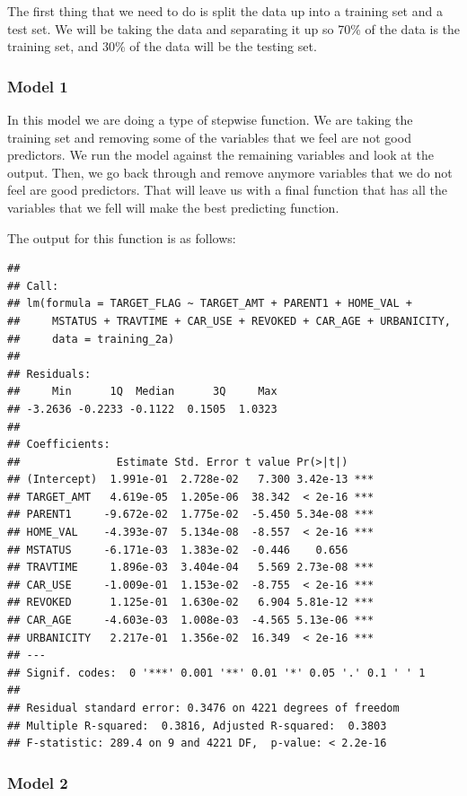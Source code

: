 \documentclass[]{article}
\begin{document}
The first thing that we need to do is split the data up into a training
set and a test set. We will be taking the data and separating it up so
70\% of the data is the training set, and 30\% of the data will be the
testing set.

\subsubsection{Model 1}\label{model-1}

In this model we are doing a type of stepwise function. We are taking
the training set and removing some of the variables that we feel are not
good predictors. We run the model against the remaining variables and
look at the output. Then, we go back through and remove anymore
variables that we do not feel are good predictors. That will leave us
with a final function that has all the variables that we fell will make
the best predicting function.

The output for this function is as follows:

\begin{verbatim}
## 
## Call:
## lm(formula = TARGET_FLAG ~ TARGET_AMT + PARENT1 + HOME_VAL + 
##     MSTATUS + TRAVTIME + CAR_USE + REVOKED + CAR_AGE + URBANICITY, 
##     data = training_2a)
## 
## Residuals:
##     Min      1Q  Median      3Q     Max 
## -3.2636 -0.2233 -0.1122  0.1505  1.0323 
## 
## Coefficients:
##               Estimate Std. Error t value Pr(>|t|)    
## (Intercept)  1.991e-01  2.728e-02   7.300 3.42e-13 ***
## TARGET_AMT   4.619e-05  1.205e-06  38.342  < 2e-16 ***
## PARENT1     -9.672e-02  1.775e-02  -5.450 5.34e-08 ***
## HOME_VAL    -4.393e-07  5.134e-08  -8.557  < 2e-16 ***
## MSTATUS     -6.171e-03  1.383e-02  -0.446    0.656    
## TRAVTIME     1.896e-03  3.404e-04   5.569 2.73e-08 ***
## CAR_USE     -1.009e-01  1.153e-02  -8.755  < 2e-16 ***
## REVOKED      1.125e-01  1.630e-02   6.904 5.81e-12 ***
## CAR_AGE     -4.603e-03  1.008e-03  -4.565 5.13e-06 ***
## URBANICITY   2.217e-01  1.356e-02  16.349  < 2e-16 ***
## ---
## Signif. codes:  0 '***' 0.001 '**' 0.01 '*' 0.05 '.' 0.1 ' ' 1
## 
## Residual standard error: 0.3476 on 4221 degrees of freedom
## Multiple R-squared:  0.3816, Adjusted R-squared:  0.3803 
## F-statistic: 289.4 on 9 and 4221 DF,  p-value: < 2.2e-16
\end{verbatim}

\subsubsection{Model 2}\label{model-2}
\end{document}

